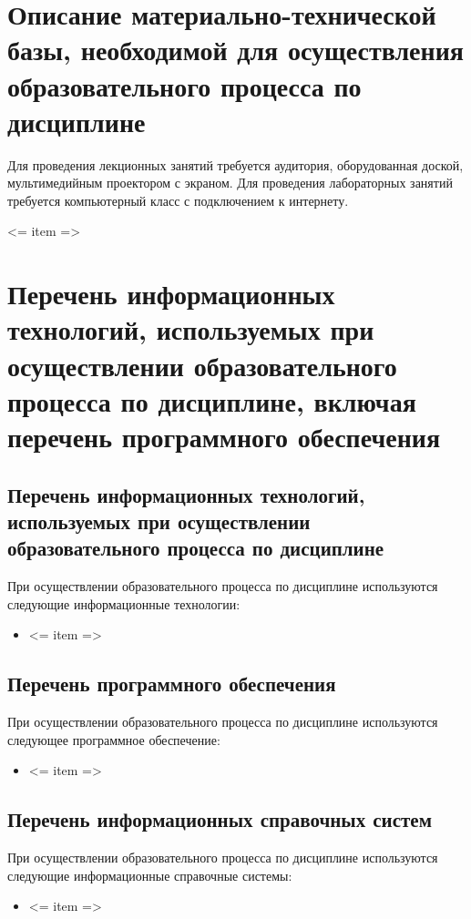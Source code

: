 \documentclass[a4paper,12pt]{article}
\begin{document}
\newpage
\section{Описание материально-технической базы, необходимой для осуществления образовательного процесса по дисциплине}
       Для проведения лекционных занятий требуется аудитория, оборудованная доской,  мультимедийным проектором с экраном. 
       Для проведения лабораторных занятий требуется компьютерный класс с подключением к интернету.
       \par <= item => 


\section{Перечень информационных технологий, используемых при осуществлении образовательного процесса по дисциплине, включая перечень программного обеспечения%
}

\subsection{Перечень информационных технологий, используемых при осуществлении образовательного процесса по дисциплине}

При осуществлении образовательного процесса по дисциплине используются следующие информационные технологии:
\begin{itemize}[nolistsep]
\item <= item =>
\end{itemize}

\subsection{Перечень программного обеспечения}
При осуществлении образовательного процесса по дисциплине используются следующее программное обеспечение:
\begin{itemize}[nolistsep]
\item <= item =>
\end{itemize}

\subsection{Перечень информационных справочных систем}
При осуществлении образовательного процесса по дисциплине используются следующие информационные справочные системы:
\begin{itemize}[nolistsep]
\item <= item =>
\end{itemize}
\end{document}
